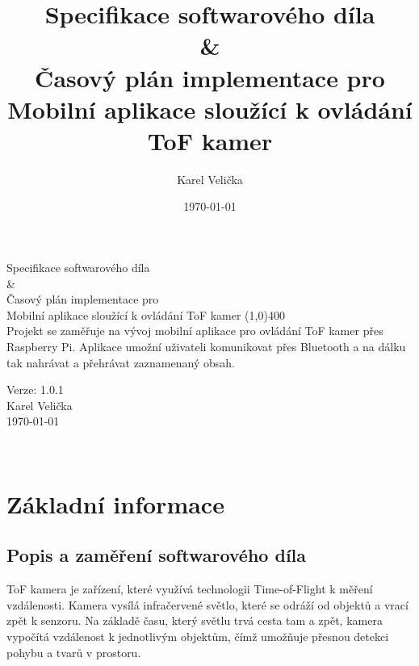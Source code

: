 \documentclass[12pt,a4paper]{article}
\title{Specifikace softwarového díla\\ \&\\ Časový plán implementace pro\\ \LARGE{Mobilní aplikace sloužící k ovládání ToF kamer}}
\date{\today}
\author{\sc Karel Velička}
\begin{document}
\thispagestyle{empty} 	%
\begin{center}
    {\LARGE Specifikace softwarového díla\\ \&\\ Časový plán implementace pro\\[5mm] Mobilní aplikace sloužící k ovládání ToF kamer}
    \line(1,0){400}\\ [10mm]
    
    {\large Projekt se zaměřuje na vývoj mobilní aplikace pro ovládání ToF kamer přes Raspberry Pi.
    Aplikace umožní uživateli komunikovat přes Bluetooth a na dálku tak nahrávat a přehrávat zaznamenaný obsah.} %
    
    \vfill    


    Verze: 1.0.1 \\[10mm]
    \sc Karel Velička\\ [10mm]
    \today
    
    ~ \\ [1cm]
    \end{center}

\begin{center}
    
\end{center}

\begin{center}
   
\end{center}

\newpage
\tableofcontents


\newpage


\section{Základní informace}

\subsection{Popis a zaměření softwarového díla}

ToF kamera je zařízení, které využívá technologii Time-of-Flight k měření vzdálenosti. 
Kamera vysílá infračervené světlo, které se odráží od objektů a vrací zpět k senzoru. 
Na základě času, který světlu trvá cesta tam a zpět, kamera vypočítá vzdálenost k jednotlivým objektům, čímž umožňuje přesnou detekci pohybu a tvarů v prostoru.
\end{document}
